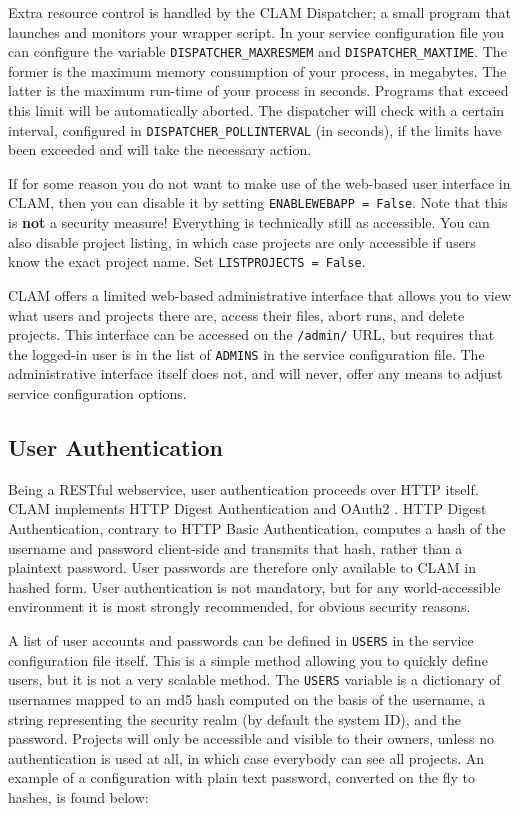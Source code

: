 \documentclass[a4paper,12pt,twoside,openright]{report}
\begin{document}
Extra resource control is handled by the CLAM Dispatcher; a small program that
launches and monitors your wrapper script. In your service configuration file
you can configure the variable \texttt{DISPATCHER\_MAXRESMEM} and
\texttt{DISPATCHER\_MAXTIME}. The former is the maximum memory consumption of
your process, in megabytes. The latter is the maximum run-time of your process
in seconds. Programs that exceed this limit will be automatically aborted. The
dispatcher will check with a certain interval, configured in
\texttt{DISPATCHER\_POLLINTERVAL} (in seconds), if the limits have been
exceeded and will take the necessary action.  
  

If for some reason you do not want to make use of the web-based user interface
in CLAM, then you can disable it by setting \texttt{ENABLEWEBAPP = False}. Note
that this is \textbf{not} a security measure! Everything is technically still
as accessible. You can also disable project listing, in which case projects are
only accessible if users know the exact project name. Set \texttt{LISTPROJECTS
= False}.

CLAM offers a limited web-based administrative interface that allows you to
view what users and projects there are,  access their files, abort runs, and
delete projects. This interface can be accessed on the \texttt{/admin/} URL,
but requires that the logged-in user is in the list of \texttt{ADMINS} in the
service configuration file. The administrative interface itself does not, and
will never, offer any means to adjust service configuration options.

\subsection{User Authentication}

Being a RESTful webservice, user authentication proceeds over HTTP itself. CLAM
implements HTTP Digest Authentication \cite{HTTPAUTH} and OAuth2 \cite{OAUTH2}. HTTP Digest
Authentication, contrary to HTTP Basic Authentication, computes a hash of the
username and password client-side and transmits that hash, rather than a
plaintext password. User passwords are therefore only available to CLAM in
hashed form. User authentication is not mandatory, but for any world-accessible
environment it is most strongly recommended, for obvious security reasons.

A list of user accounts and passwords can be defined in \texttt{USERS} in the
service configuration file itself. This is a simple method allowing you to
quickly define users, but it is not a very scalable method. The \texttt{USERS}
variable is a dictionary of usernames mapped to an md5 hash computed on the
basis of the username, a string representing the security realm (by default the
system ID), and the password. Projects will only be accessible and visible to
their owners, unless no authentication is used at all, in which case everybody
can see all projects. An example of a configuration with plain text password,
converted on the fly to hashes, is found below:
\end{document}

